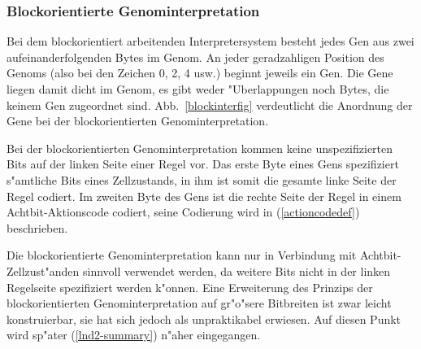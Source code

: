 \subsubsection{Blockorientierte Genominterpretation}
\label{blockinterdef}

Bei dem blockorientiert arbeitenden Interpretersystem
besteht jedes Gen aus zwei aufeinanderfolgenden Bytes im Genom. An jeder
geradzahligen Position des Genoms (also bei den Zeichen 0, 2, 4 usw.) beginnt
jeweils ein Gen. Die Gene liegen damit dicht im Genom, es gibt weder
"Uberlappungen noch Bytes, die keinem Gen zugeordnet sind. Abb.\ \ref{blockinterfig}
verdeutlicht die Anordnung der Gene bei der blockorientierten Genominterpretation.

Bei der blockorientierten Genominterpretation kommen keine unspezifizierten Bits auf
der linken Seite einer Regel vor. Das erste Byte eines Gens 
spezifiziert s"amtliche Bits eines Zellzustands,
in ihm ist somit die gesamte linke Seite der Regel codiert. Im zweiten
Byte des Gens ist die rechte Seite der Regel in einem Achtbit-Aktionscode codiert,
seine Codierung wird in (\ref{actioncodedef}) beschrieben.

Die blockorientierte Genominterpretation kann nur in Verbindung mit
Achtbit-Zell\-zu\-st"an\-den sinnvoll verwendet werden, da weitere Bits nicht
in der linken Regelseite spezifiziert werden k"onnen. Eine Erweiterung
des Prinzips der blockorientierten Genominterpretation auf gr"o"sere Bitbreiten ist
zwar leicht konstruierbar, sie hat sich jedoch als unpraktikabel erwiesen.
Auf diesen Punkt wird sp"ater (\ref{lnd2-summary}) n"aher eingegangen.

